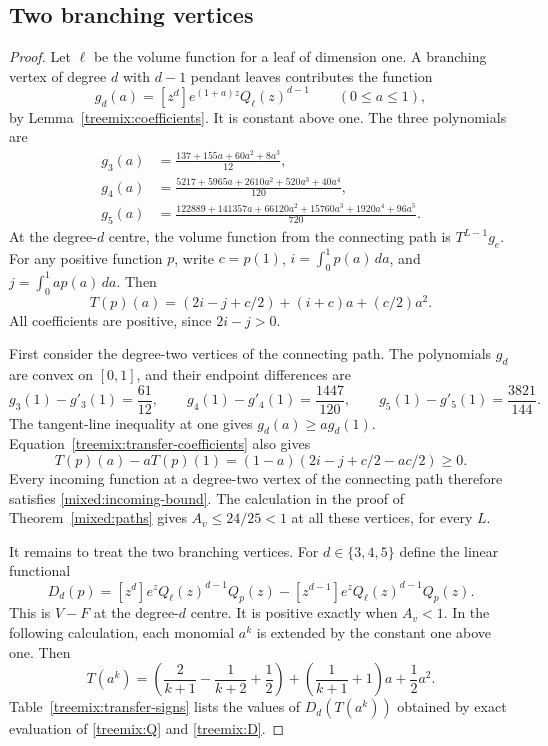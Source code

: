 \subsection{Two branching vertices}
\begin{proof}
Let $\ell$ be the volume function for a leaf of dimension one. A
branching vertex of degree $d$ with $d-1$ pendant leaves contributes
the function
\[
 g_d(a)=[z^d]e^{(1+a)z}Q_\ell(z)^{d-1}\qquad(0\le a\le1),
\]
by Lemma~\ref{treemix:coefficients}. It is constant above one. The three
polynomials are
\begin{align*}
 g_3(a)&=\frac{137+155a+60a^2+8a^3}{12},\\
 g_4(a)&=\frac{5217+5965a+2610a^2+520a^3+40a^4}{120},\\
 g_5(a)&=\frac{122889+141357a+66120a^2+15760a^3+1920a^4+96a^5}{720}.
\end{align*}
At the degree-$d$ centre, the volume function from the connecting path
is $T^{L-1}g_e$. For any positive function $p$, write $c=p(1)$,
$i=\int_0^1p(a)\,da$, and $j=\int_0^1ap(a)\,da$. Then
\begin{equation}\label{treemix:transfer-coefficients}
 T(p)(a)=(2i-j+c/2)+(i+c)a+(c/2)a^2.
\end{equation}
All coefficients are positive, since $2i-j>0$.

First consider the degree-two vertices of the connecting path. The
polynomials $g_d$ are convex on $[0,1]$, and their endpoint differences are
\[
 g_3(1)-g'_3(1)=\frac{61}{12},\qquad
 g_4(1)-g'_4(1)=\frac{1447}{120},\qquad
 g_5(1)-g'_5(1)=\frac{3821}{144}.
\]
The tangent-line inequality at one gives $g_d(a)\ge a g_d(1)$.
Equation~\eqref{treemix:transfer-coefficients} also gives
\[
 T(p)(a)-aT(p)(1)=(1-a)(2i-j+c/2-ac/2)\ge0.
\]
Every incoming function at a degree-two vertex of the connecting path
therefore satisfies \eqref{mixed:incoming-bound}. The calculation in
the proof of Theorem~\ref{mixed:paths} gives $A_v\le24/25<1$ at all
these vertices, for every $L$.

It remains to treat the two branching vertices. For $d\in\{3,4,5\}$
define the linear functional
\begin{equation}\label{treemix:D}
 D_d(p)=[z^d]e^zQ_\ell(z)^{d-1}Q_p(z)
       -[z^{d-1}]e^zQ_\ell(z)^{d-1}Q_p(z).
\end{equation}
This is $V-F$ at the degree-$d$ centre. It is positive exactly when
$A_v<1$. In the following calculation, each monomial $a^k$ is extended
by the constant one above one. Then
\[
 T(a^k)=\left(\frac2{k+1}-\frac1{k+2}+\frac12\right)
        +\left(\frac1{k+1}+1\right)a+\frac12a^2.
\]
Table~\ref{treemix:transfer-signs} lists the values of $D_d(T(a^k))$
obtained by exact evaluation of \eqref{treemix:Q} and
\eqref{treemix:D}.


\end{proof}
